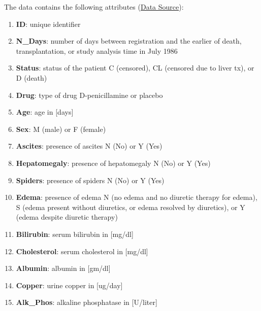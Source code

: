 \documentclass[
]{article}
\providecommand{\tightlist}{%
  \setlength{\itemsep}{0pt}\setlength{\parskip}{0pt}}
\begin{document}
The data contains the following attributes
(\href{https://www.kaggle.com/datasets/fedesoriano/cirrhosis-prediction-dataset/data}{Data
Source}):

\begin{enumerate}
\def\labelenumi{\arabic{enumi})}
\tightlist
\item
  \textbf{ID}: unique identifier\\
\item
  \textbf{N\_Days}: number of days between registration and the earlier
  of death, transplantation, or study analysis time in July 1986\\
\item
  \textbf{Status}: status of the patient C (censored), CL (censored due
  to liver tx), or D (death)\\
\item
  \textbf{Drug}: type of drug D-penicillamine or placebo\\
\item
  \textbf{Age}: age in {[}days{]}\\
\item
  \textbf{Sex}: M (male) or F (female)\\
\item
  \textbf{Ascites}: presence of ascites N (No) or Y (Yes)\\
\item
  \textbf{Hepatomegaly}: presence of hepatomegaly N (No) or Y (Yes)\\
\item
  \textbf{Spiders}: presence of spiders N (No) or Y (Yes)\\
\item
  \textbf{Edema}: presence of edema N (no edema and no diuretic therapy
  for edema), S (edema present without diuretics, or edema resolved by
  diuretics), or Y (edema despite diuretic therapy)\\
\item
  \textbf{Bilirubin}: serum bilirubin in {[}mg/dl{]}\\
\item
  \textbf{Cholesterol}: serum cholesterol in {[}mg/dl{]}\\
\item
  \textbf{Albumin}: albumin in {[}gm/dl{]}\\
\item
  \textbf{Copper}: urine copper in {[}ug/day{]}\\
\item
  \textbf{Alk\_Phos}: alkaline phosphatase in {[}U/liter{]}\\

\end{enumerate}
\end{document}
